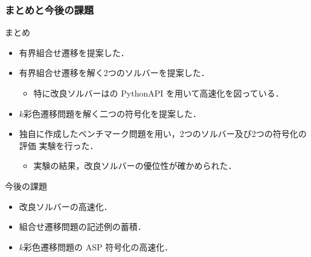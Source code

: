 \documentclass[dvipdfmx,11pt]{beamer}
\begin{document}
\begin{frame}\frametitle{まとめと今後の課題}

  \begin{block}{まとめ}
    \begin{itemize}
      \item 有界組合せ遷移を提案した．
      \item 有界組合せ遷移を解く2つのソルバーを提案した．
      \begin{itemize}
        \item 特に改良ソルバーは{\clingo}の PythonAPI を用いて高速化を図っている．
      \end{itemize}
      \item $k$彩色遷移問題を解く二つの符号化を提案した．
      \item 独自に作成したベンチマーク問題を用い，2つのソルバー及び2つの符号化の評価
            実験を行った．
      \begin{itemize}
        \item 実験の結果，改良ソルバーの優位性が確かめられた．
      \end{itemize}
    \end{itemize}
  \end{block}
  
  \begin{alertblock}{今後の課題}
    \begin{itemize}
      \item 改良ソルバーの高速化．
      \item 組合せ遷移問題の記述例の蓄積．
      \item $k$彩色遷移問題の ASP 符号化の高速化．
    \end{itemize}
  \end{alertblock}

\end{frame}



\end{document}
